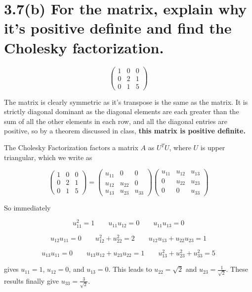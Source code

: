 \documentclass{article}
\begin{document}
\section*{3.7(b) \normalsize For the matrix, explain why it's positive definite and find the Cholesky factorization.}

\[\begin{pmatrix}
  1 & 0 & 0 \\ 0 & 2 & 1 \\ 0 & 1 & 5
\end{pmatrix}\]

The matrix is clearly symmetric as it's transpose is the same as the matrix. It is strictly diagonal dominant as the diagonal elements are each greater than the sum of all the other elements in each row, and all the diagonal entries are positive, so by a theorem discussed in class, \textbf{this matrix is positive definite.}

The Cholesky Factorization factors a matrix $A$ as $U^T U$, where $U$ is upper triangular, which we write as

\[
\begin{pmatrix}
  1 & 0 & 0 \\ 0 & 2 & 1 \\ 0 & 1 & 5
\end{pmatrix}
=
\begin{pmatrix}
  u_{11} & 0 & 0 \\ u_{12} & u_{22} & 0 \\ u_{13} & u_{23} & u_{33}
\end{pmatrix}
\begin{pmatrix}
  u_{11} & u_{12} & u_{13} \\ 0 & u_{22} & u_{23} \\ 0 & 0 & u_{33}
\end{pmatrix}
\]

So immediately 

$$u_{11}^2 = 1 \qquad u_{11}u_{12} = 0 \qquad u_{11}u_{13} = 0$$

$$u_{12}u_{11} = 0 \qquad u_{12}^2 + u_{22}^2 = 2 \qquad u_{12}u_{13} + u_{22}u_{23} = 1$$

$$u_{13}u_{11} = 0 \qquad u_{13}u_{12} + u_{23}u_{22} = 1 \qquad u_{13}^2 + u_{23}^2 + u_{33}^2 = 5$$

\smallskip

gives $u_{11} = 1$, $u_{12} = 0$, and $u_{13} = 0$. This leads to $u_{22} = \sqrt{2}$ and $u_{23} = \frac{1}{\sqrt{2}}$. These results finally give $u_{33} = \frac{3}{\sqrt{2}}$.
\end{document}
